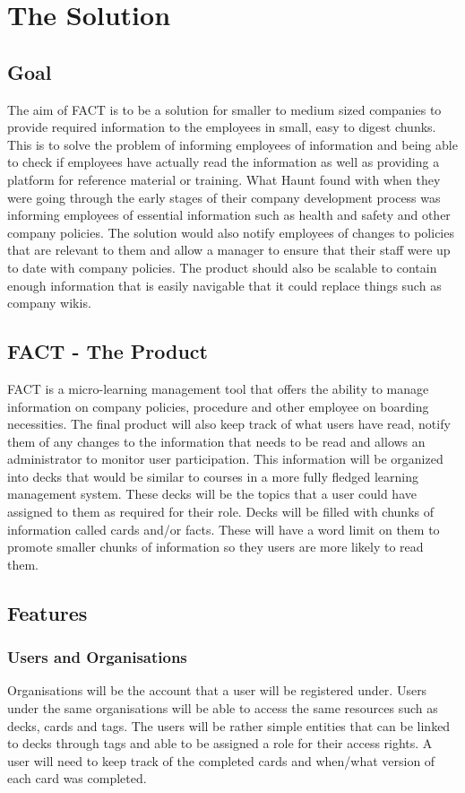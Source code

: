 
\chapter{The Solution}

\section{Goal}
The aim of FACT is to be a solution for smaller to medium sized companies to provide required information to the employees in small, easy to digest chunks. This is to solve the problem of informing employees of information and being able to check if employees have actually read the information as well as providing a platform for reference material or training. What Haunt found with when they were going through the early stages of their company development process was informing employees of essential information such as health and safety and other company policies. The solution would also notify employees
of changes to policies that are relevant to them and allow a manager to ensure that their staff were up to date with company policies. The product should also be scalable to contain enough information that is easily navigable that it could replace things such as company wikis.

\section{FACT - The Product}
FACT is a micro-learning management tool that offers the ability to manage information on company policies, procedure and other employee on boarding necessities. The final product will also keep track of what users have read, notify them of any changes to the information that needs to be read and allows an administrator to monitor user participation. This information will be organized into decks that would be similar to courses in a more fully fledged learning management system. These decks will be the topics that a user could have assigned to them as required for their role. Decks will be filled with chunks of information called cards and/or facts. These will have a word limit on them to promote smaller chunks of information so they users are more likely to read them.

\section{Features}
\subsection{Users and Organisations}
Organisations will be the account that a user will be registered under. Users under the same organisations will be able to access  the same resources such as decks, cards and tags. The users will be rather simple entities that can be linked to decks through tags and able to be assigned a role for their access rights. A user will need to keep track of the completed cards and when/what version of each card was completed.

